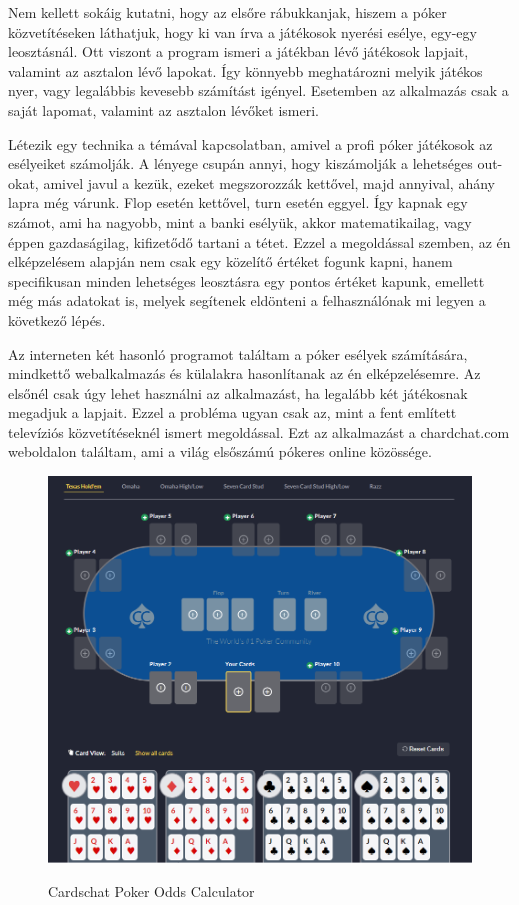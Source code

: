 Nem kellett sokáig kutatni, hogy az elsőre rábukkanjak, hiszem a póker közvetítéseken láthatjuk, hogy ki van írva a játékosok nyerési esélye, egy-egy leosztásnál. Ott viszont a program ismeri a játékban lévő játékosok lapjait, valamint az asztalon lévő lapokat. Így könnyebb meghatározni melyik játékos nyer, vagy legalábbis kevesebb számítást igényel. Esetemben az alkalmazás csak a saját lapomat, valamint az asztalon lévőket ismeri.

Létezik egy technika a témával kapcsolatban, amivel a profi póker játékosok az esélyeiket számolják. A lényege csupán annyi, hogy kiszámolják a lehetséges out-okat, amivel javul a kezük, ezeket megszorozzák kettővel, majd annyival, ahány lapra még várunk. Flop esetén kettővel, turn esetén eggyel. Így kapnak egy számot, ami ha nagyobb, mint a banki esélyük, akkor matematikailag, vagy éppen gazdaságilag, kifizetődő tartani a tétet. Ezzel a megoldással szemben, az én elképzelésem alapján nem csak egy közelítő értéket fogunk kapni, hanem specifikusan minden lehetséges leosztásra egy pontos értéket kapunk, emellett még más adatokat is, melyek segítenek eldönteni a felhasználónak mi legyen a következő lépés.

Az interneten két hasonló programot találtam a póker esélyek számítására, mindkettő webalkalmazás és külalakra hasonlítanak az én elképzelésemre. Az elsőnél csak úgy lehet használni az alkalmazást, ha legalább két játékosnak megadjuk a lapjait. Ezzel a probléma ugyan csak az, mint a fent említett televíziós közvetítéseknél ismert megoldással. Ezt az alkalmazást a chardchat.com weboldalon találtam, ami a világ elsőszámú pókeres online közössége.

\begin{figure}[h!]
\centering
\includegraphics[scale=0.55]{images/cardschat.png}
\caption{Cardschat Poker Odds Calculator}
\cite{cardschat}
\label{fig:cardschat}
\end{figure}


